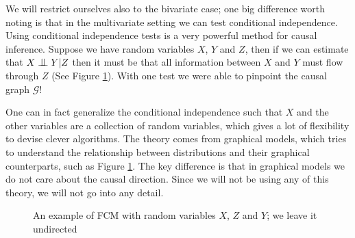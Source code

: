

We will restrict ourselves also to the bivariate case; one big difference worth noting is that in the
multivariate setting we can test conditional independence. Using conditional independence tests 
is a very powerful method for causal inference. Suppose 
we have random variables $X$, $Y$ and $Z$, then if we can estimate that $X \bigCI Y | Z$ then it must be 
that all information between $X$ and $Y$ must flow through $Z$ (See Figure \ref{fig:conditionalIndep}).
With one test we were able to pinpoint the causal graph $\mathcal{G}$! 

One can in fact generalize the conditional independence such that $X$ and the other variables are 
a collection of random variables, which gives a lot of flexibility to devise clever algorithms. 
The theory comes from graphical models, which tries to understand the relationship between 
distributions and their graphical counterparts, such as Figure \ref{fig:conditionalIndep}.
The key difference is that in graphical models we do not care about the causal direction. 
Since we will not be using any of this theory, we will not go into any detail. 

\begin{figure}[!h]
    \centering

    \caption{An example of FCM with random variables $X$, $Z$ and $Y$; we leave it undirected}
    \label{fig:conditionalIndep}

\end{figure}

